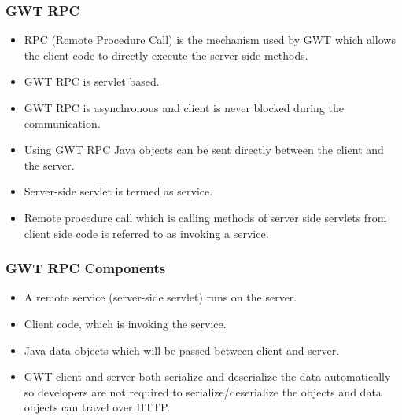 \documentclass[10pt,table, xcolor=pdflatex]{beamer}
\begin{document}
\begin{frame}\frametitle{GWT RPC}
	\begin{itemize}
		\item RPC (Remote Procedure Call) is the mechanism used by GWT which allows the client code to directly execute the server side methods.
		\item GWT RPC is servlet based.
		\item GWT RPC is asynchronous and client is never blocked during the communication.
		\item Using GWT RPC Java objects can be sent directly between the client and the server.
		\item Server-side servlet is termed as service.
		\item Remote procedure call which is calling methods of server side servlets from client side code is referred to as invoking a service.
	\end{itemize}
\end{frame}


\begin{frame}\frametitle{GWT RPC Components}
	\begin{itemize}
		\item A remote service (server-side servlet) runs on the server.
		\item Client code, which is invoking the service.
		\item Java data objects which will be passed between client and server.
        \medskip
		\item GWT client and server both serialize and deserialize the data automatically so developers are not required to serialize/deserialize the objects and data objects can travel over HTTP.
	\end{itemize}
\end{frame}
\end{document}

